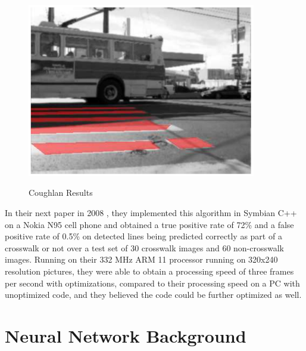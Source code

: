 \documentclass[12pt]{ucthesis}
\newcommand{\captionfonts}{\small\bf\ssp}
\begin{document}
\begin{figure}[t]
\begin{center}
\includegraphics[width=10cm]{CoughlanResult.png}
\captionfonts
\caption[Coughlan Results]{Coughlan Results \cite{Coughlan2006}}
\label{fig:CoughlanResults}
\end{center}
\end{figure}

In their next paper in 2008 \cite{ZebraPhone}, they implemented this algorithm in Symbian C++ on a Nokia  N95 cell phone and obtained a true positive rate of 72\% and a false positive rate of 0.5\% on detected lines being predicted correctly as part of a crosswalk or not over a test set of 30 crosswalk images and 60 non-crosswalk images. Running on their 332 MHz ARM 11 processor running on 320x240 resolution pictures, they were able to obtain a processing speed of three frames per second with optimizations, compared to their processing speed on a PC with unoptimized code, and they believed the code could be further optimized as well. 

\chapter{Neural Network Background}

\end{document}
